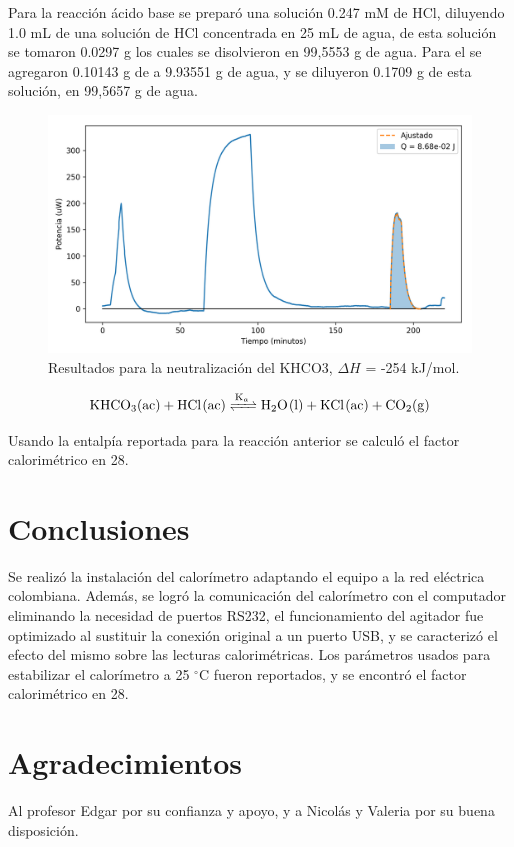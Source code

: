 \documentclass[a0]{sciposter}
\newcommand{\grad}{$^\circ$C}
\newcommand{\figwidth}{0.7\linewidth}
\begin{document}
\begin{multicols}{3}
	Para la reacci\'on \'acido base se prepar\'o una soluci\'on 0.247 mM de HCl, diluyendo 1.0 mL de una soluci\'on de HCl concentrada en 25 mL de agua, de esta soluci\'on se tomaron 0.0297 g los cuales se disolvieron en 99,5553 g de agua. Para el  se agregaron 0.10143 g de  a 9.93551 g de agua, y se diluyeron 0.1709 g de esta soluci\'on, en 99,5657 g de agua.

	\begin{figure}[h]
		\centering
		\includegraphics[width=\figwidth]{../Data/ChemicalCalibrations/HCl}
		\caption{Resultados para la neutralización del {KHCO3}, $\Delta H$ = -254 kJ/mol.}
	\end{figure}

	\begin{equation}
		\ce{KHCO3(ac) + HCl(ac) <=>[K_a] H2O(l) + KCl(ac) + CO2(g)}
	\end{equation}

	Usando la entalp\'ia reportada para la reacci\'on anterior se calcul\'o el factor calorim\'etrico en 28.
	
\section{Conclusiones}
	Se realiz\'o la instalaci\'on del calorímetro adaptando el equipo a la red eléctrica colombiana. Además, se logró la comunicaci\'on del calor\'imetro con el computador eliminando la necesidad de puertos RS232, el funcionamiento del agitador fue optimizado al sustituir la conexión original a un puerto USB, y se caracteriz\'o el efecto del mismo sobre las lecturas calorim\'etricas. Los parámetros usados para estabilizar el calorímetro a 25 \grad{} fueron reportados, y se encontró el factor calorimétrico en 28.

\printbibliography[heading=bibintoc, title={Referencias}]
\section*{Agradecimientos}
	Al profesor Edgar por su confianza y apoyo, y a Nicol\'as y Valeria por su buena disposici\'on.
\end{multicols}
\end{document}
